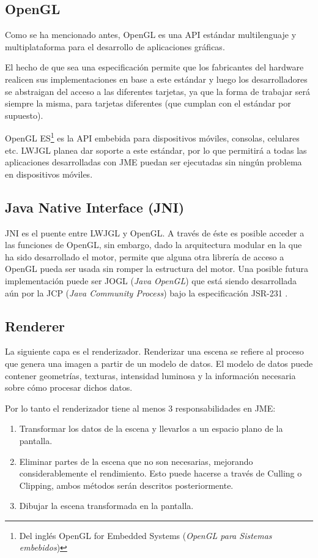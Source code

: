 \documentclass[a4paper,12pt,openany,oneside]{book}
\begin{document}
\subsection{OpenGL}
Como se ha mencionado antes, OpenGL es una API estándar multilenguaje y multiplataforma para el desarrollo de aplicaciones gráficas. 

El hecho de que sea una especificación permite que los fabricantes del hardware realicen sus implementaciones en base a este estándar y luego los desarrolladores se abstraigan del acceso a las diferentes tarjetas, ya que la forma de trabajar será siempre la misma, para tarjetas diferentes (que cumplan con el estándar por supuesto).

OpenGL ES\footnote{Del inglés OpenGL for Embedded Systems (\textit{OpenGL para Sistemas embebidos})} es la API embebida para dispositivos móviles, consolas, celulares etc. LWJGL planea dar soporte a este estándar, por lo que permitirá a todas las aplicaciones desarrolladas con JME puedan ser ejecutadas sin ningún problema en dispositivos móviles.
\subsection{Java Native Interface (JNI)}
JNI es el puente entre LWJGL y OpenGL. A través de éste es posible acceder a las funciones de OpenGL, sin embargo, dado la arquitectura modular en la que ha sido desarrollado el motor, permite que alguna otra librería de acceso a OpenGL pueda ser usada sin romper la estructura del motor. Una posible futura implementación puede ser JOGL (\textit{Java OpenGL}) que está siendo desarrollada aún por la JCP (\textit{Java Community Process}) bajo la especificación JSR-231 \cite{JSR}.
\subsection{Renderer}
La siguiente capa es el renderizador. Renderizar una escena se refiere al proceso que genera una imagen a partir de un modelo de datos. El modelo de datos puede contener geometrías, texturas, intensidad luminosa y la información necesaria sobre cómo procesar dichos datos. 

Por lo tanto el renderizador tiene al menos 3 responsabilidades en JME:
\begin{enumerate}
\item Transformar los datos de la escena y llevarlos a un espacio plano de la pantalla.
\item Eliminar partes de la escena que no son necesarias, mejorando considerablemente el rendimiento. Esto puede hacerse a través de Culling o Clipping, ambos métodos serán descritos posteriormente. 
\item Dibujar la escena transformada en la pantalla.
\end{enumerate}
\end{document}
